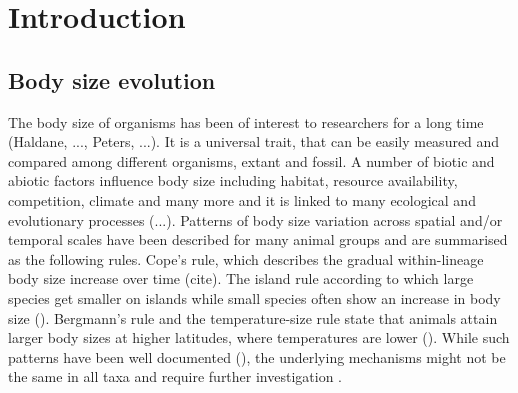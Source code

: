\section{Introduction}
\subsection{Body size evolution}

The body size of organisms has been of interest to researchers for a long time (Haldane, ..., Peters, ...). It is a universal trait, that can be easily measured and compared among different organisms, extant and fossil. A number of biotic and abiotic factors influence body size including habitat, resource availability, competition, climate and many more and it is linked to many ecological and evolutionary processes (...).
Patterns of body size variation across spatial and/or temporal scales have been described for many animal groups and are summarised as the following rules.
Cope's rule, which describes the gradual within-lineage body size increase over time (cite). The island rule according to which large species get smaller on islands while small species often show an increase in body size (). Bergmann's rule and the temperature-size rule state that animals attain larger body sizes at higher latitudes, where temperatures are lower ().
While such patterns have been well documented
(), the underlying mechanisms might not be the same in all taxa and require further investigation \citep{Smith2009}.





